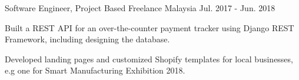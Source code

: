 \begin{cventries}
  \cventry
    {Software Engineer, Project Based} %
    {Freelance} %
    {Malaysia} %
    {Jul. 2017 - Jun. 2018} %
    {
      \begin{cvitems} %
        \item {Built a REST API for an over-the-counter payment tracker using Django REST Framework, including designing the database.}
        \item {Developed landing pages and customized Shopify templates for local businesses, e.g one for Smart Manufacturing Exhibition 2018.}
      \end{cvitems}
    }

\end{cventries}

\pagebreak

